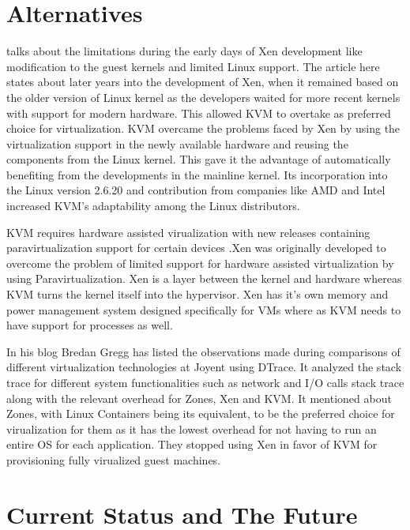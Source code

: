 \documentclass[9pt,twocolumn,twoside]{styles/osajnl}
\begin{document}
\section{Alternatives}

\cite{www-kvm-evolution} talks about the limitations during the early days of Xen development like modification to the guest kernels and limited Linux support. The article here \cite{www-kvm-rise} states about later years into the development of Xen, when it remained based on the older version of Linux kernel as the developers waited for more recent kernels with support for modern hardware. This allowed KVM to overtake as preferred choice for virtualization. KVM overcame the problems faced by Xen by using the virtualization support in the newly available hardware and reusing the components from the Linux kernel. This gave it the advantage of automatically benefiting from the developments in the mainline kernel. Its incorporation into the Linux version 2.6.20 and contribution from companies like AMD and Intel increased KVM's adaptability among the Linux distributors.

KVM requires hardware assisted virualization with new releases containing paravirtualization support for certain devices \cite{www-kvm-wiki}.Xen was originally developed to overcome the problem of limited support for hardware assisted virtualization \cite{www-xen-pvh} by using Paravirtualization. Xen is a layer between the kernel and hardware whereas KVM turns the kernel itself into the hypervisor. Xen has it's own memory and power management system designed specifically for VMs where as KVM needs to have support for processes as well.

In his blog \cite{www-tech-comparison} Bredan Gregg has listed the observations made during comparisons of different virtualization technologies at Joyent using DTrace. It analyzed the stack trace for different system functionalities such as network and I/O calls stack trace along with the relevant overhead for Zones, Xen and KVM. It mentioned about Zones, with Linux Containers being its equivalent, to be the preferred choice for virualization for them as it has the lowest overhead for not having to run an entire OS for each application. They stopped using Xen in favor of KVM for provisioning fully virualized guest machines.

\section{Current Status and The Future}
\end{document}
